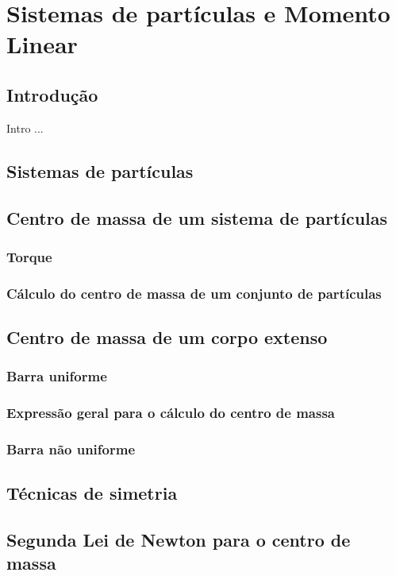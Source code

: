 \chapter{Sistemas de partículas e Momento Linear}
\label{Chap:MomentoLinear}
\minitoc

\clearpage

\section{Introdução}
{\it

Intro ...

}

\section{Sistemas de partículas}
\section{Centro de massa de um sistema de partículas}
\subsection{Torque}
\subsection{Cálculo do centro de massa de um conjunto de partículas}
\section{Centro de massa de um corpo extenso}
\subsection{Barra uniforme} %
\subsection{Expressão geral para o cálculo do centro de massa}
\subsection{Barra não uniforme}
\section{Técnicas de simetria}
\section{Segunda Lei de Newton para o centro de massa}
